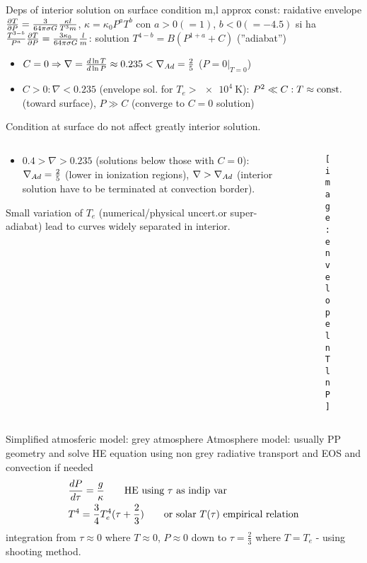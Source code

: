 \begin{frame}{Deps of interior solution on surface condition}
m,l approx const: raidative envelope $\PDy{P}{T}=\frac{3}{64\pi\sigma G}\frac{\kappa l}{T^3m}$, $\kappa=\kappa_0P^aT^b$ con $a>0(=1)$, $b<0(=-4.5)$ si ha $\frac{T^{3-b}}{P^a}\PDy{P}{T}=\frac{3\kappa_0}{64\pi\sigma G}\frac{l}{m}$: solution $T^{4-b}=B(P^{1+a}+C)$ (''adiabat'')
\begin{itemize}
	\item $C=0\Rightarrow \nabla=\TDly{P}{T}\approx0.235<\nad=\frac{2}{5}$ ($P=0|_{T=0}$)
	\item $C>0: \nabla<0.235$ (envelope sol. for $T_e>\SI{e4}{\kelvin}$): $P^2\ll C: T\approx\const{}$ (toward surface), $P\gg C$ (converge to $C=0$ solution)
	
\end{itemize}
Condition at surface do not affect greatly interior solution.
\begin{columns}[T]
\begin{column}{0.45\textwidth}
\begin{itemize}
	\item $0.4>\nabla>0.235$ (solutions below those with $C=0$): $\nad=\frac{2}{5}$ (lower in ionization regions),
	$\nabla>\nad$ (interior solution have to be terminated at convection border).
\end{itemize}
Small variation of $T_e$ (numerical/physical uncert.or super-adiabat) lead to curves widely separated in interior.
\end{column}
\begin{column}{0.55\textwidth}
\begin{figure}[!ht]
	\texttt{[image: envelopelnTlnP]}\label{fig:envelopelnTlnP}
\end{figure}
\end{column}
\end{columns}

\end{frame}

\begin{frame}{Simplified atmosferic model: grey atmosphere}
Atmosphere model: usually PP geometry and solve HE equation using non grey radiative transport and EOS and convection if needed
\begin{align*}
&\TDy{\tau}{P}=\frac{g}{\kappa}\tag*{HE using $\tau$ as indip var}\\
&T^4=\frac{3}{4}T_e^4(\tau+\frac{2}{3})\tag*{or solar $T(\tau)$ empirical relation}
\end{align*}
integration from $\tau\approx0$ where $T\approx0$, $P\approx0$ down to $\tau=\frac{2}{3}$ where $T=T_e$ - using shooting method.
\end{frame}

